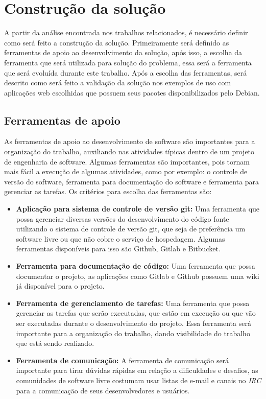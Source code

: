 \section{Construção da solução}
\label{section:construcao}

A partir da análise encontrada nos trabalhos relacionados, é necessário definir
como será feito a construção da solução. Primeiramente será definido as ferramentas
de apoio ao desenvolvimento da solução, após isso, a escolha da ferramenta que será
utilizada para solução do problema, essa será a ferramenta que será evoluída
durante este trabalho. Após a escolha das ferramentas, será descrito como será
feito a validação da solução nos exemplos de uso com aplicações web escolhidas que possuem
seus pacotes disponibilizados pelo Debian.

\subsection{Ferramentas de apoio}

As ferramentas de apoio ao desenvolvimento de software são importantes para a
organização do trabalho, auxiliando nas atividades típicas dentro de um projeto
de engenharia de software. Algumas ferramentas são importantes, pois tornam mais fácil
a execução de algumas atividades, como por exemplo: o controle de versão do software,
ferramenta para documentação do software e ferramenta para gerenciar as tarefas.
Os critérios para escolha das ferramentas são:

\begin{itemize}
  \item \textbf{Aplicação para sistema de controle de versão git:} Uma ferramenta que
  possa gerenciar diversas versões do desenvolvimento do código fonte utilizando
  o sistema de controle de versão git, que seja de preferência um software livre
  ou que não cobre o serviço de hospedagem. Algumas ferramentas disponíveis para
  isso são Github, Gitlab e Bitbucket.
  \item \textbf{Ferramenta para documentação de código:} Uma ferramenta que possa
  documentar o projeto, as aplicações como Gitlab e Github possuem uma wiki já disponível
  para o projeto.
  \item \textbf{Ferramenta de gerenciamento de tarefas:} Uma ferramenta que possa
  gerenciar as tarefas que serão executadas, que estão em execução ou que vão ser executadas
  durante o desenvolvimento do projeto. Essa ferramenta será importante para a
  organização do trabalho, dando visibilidade do trabalho que está sendo realizado.
  \item \textbf{Ferramenta de comunicação:} A ferramenta de comunicação será
  importante para tirar dúvidas rápidas em relação a dificuldades e desafios, as
  comunidades de software livre costumam usar listas de e-mail e canais no \textit{IRC}
  para a comunicação de seus desenvolvedores e usuários.
\end{itemize}

